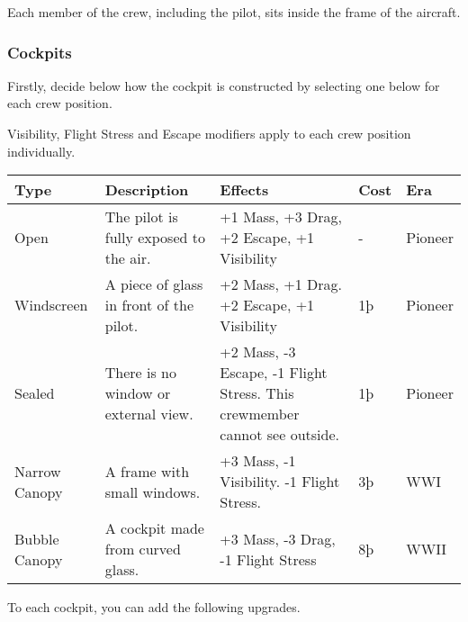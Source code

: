 \documentclass{article}
\begin{document}
Each member of the crew, including the pilot, sits inside the frame of
the aircraft.

\subsubsection{Cockpits}
\label{_Cockpits}

Firstly, decide below how the cockpit is constructed by selecting one
below for each crew position.

Visibility, Flight Stress and Escape modifiers apply to each crew
position individually.

\begin{tabular}{|l|l|l|l|l|}
    \hline
    Type                                               & Description                             & Effects                    & Cost & Era \\\hline
    Open                                               & The pilot is fully exposed to the air.  & +1 Mass, +3 Drag, +2
    Escape, +1 Visibility                              & -                                       & Pioneer                                 \\\hline
    Windscreen                                         & A piece of glass in front of the pilot. & +2 Mass, +1 Drag.
    +2 Escape, +1 Visibility                           & 1þ                                      & Pioneer                                 \\\hline
    Sealed                                             & There is no window or external view.    & +2 Mass, -3 Escape, -1
    Flight Stress. This crewmember cannot see outside. & 1þ                                      & Pioneer                                 \\\hline
    Narrow Canopy                                      & A frame with small windows.             & +3 Mass, -1 Visibility. -1
    Flight Stress.                                     & 3þ                                      & WWI                                     \\\hline
    Bubble Canopy                                      & A cockpit made from curved glass.       & +3 Mass, -3 Drag, -1
    Flight Stress                                      & 8þ                                      & WWII                                    \\\hline
\end{tabular}

To each cockpit, you can add the following upgrades.
\end{document}
